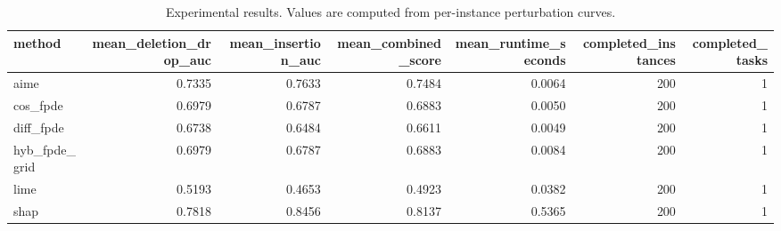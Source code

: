 \begin{table}[t]
\caption{Experimental results. Values are computed from per-instance perturbation curves.}
\label{tab:main_results_computed}
\centering
\begin{tabular}{lrrrrrr}
\toprule
method & mean\_deletion\_drop\_auc & mean\_insertion\_auc & mean\_combined\_score & mean\_runtime\_seconds & completed\_instances & completed\_tasks \\
\midrule
aime & 0.7335 & 0.7633 & 0.7484 & 0.0064 & 200 & 1 \\
cos\_fpde & 0.6979 & 0.6787 & 0.6883 & 0.0050 & 200 & 1 \\
diff\_fpde & 0.6738 & 0.6484 & 0.6611 & 0.0049 & 200 & 1 \\
hyb\_fpde\_grid & 0.6979 & 0.6787 & 0.6883 & 0.0084 & 200 & 1 \\
lime & 0.5193 & 0.4653 & 0.4923 & 0.0382 & 200 & 1 \\
shap & 0.7818 & 0.8456 & 0.8137 & 0.5365 & 200 & 1 \\
\bottomrule
\end{tabular}

\end{table}
